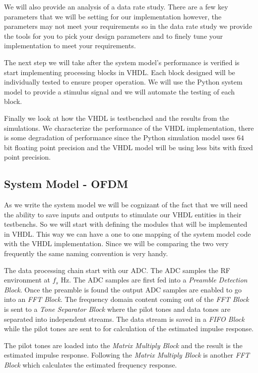 We will also provide an analysis of a data rate study. There are a few key parameters that we will be setting for our implementation however, the parameters may not meet your requirements so in the data rate study we provide the tools for you to pick your design parameters and to finely tune your implementation to meet your requirements.

The next step we will take after the system model's performance is verified is start implementing processing blocks in \ac{VHDL}. Each block designed will be individually tested to ensure proper operation. We will use the Python system model to provide a stimulus signal and we will automate the testing of each block.

Finally we look at how the \ac{VHDL} is testbenched and the results from the simulations. We characterize the performance of the \ac{VHDL} implementation, there is some degradation of performance since the Python simulation model uses $64$ bit floating point precision and the \ac{VHDL} model will be using less bits with fixed point precision.

\subsection{System Model - OFDM}

As we write the system model we will be cognizant of the fact that we will need the ability to save inputs and outputs to stimulate our \ac{VHDL} entities in their testbenchs. So we will start with defining the modules that will be implemented in \ac{VHDL}. This way we can have a one to one mapping of the system model code with the \ac{VHDL} implementation. Since we will be comparing the two very frequently the same naming convention is very handy.

The data processing chain start with our \ac{ADC}. The \ac{ADC} samples the \ac{RF} environment at $f_s$ \ac{Hz}. The \ac{ADC} samples are first fed into a \emph{Preamble Detection Block}. Once the preamble is found the output \ac{ADC} samples are enabled to go into an \emph{\ac{FFT} Block}. The frequency domain content coming out of the \emph{\ac{FFT} Block} is sent to a \emph{Tone Separator Block} where the pilot tones and data tones are separated into independent streams. The data stream is saved in a \emph{\ac{FIFO} Block} while the pilot tones are sent to for calculation of the estimated impulse response.

The pilot tones are loaded into the \emph{Matrix Multiply Block} and the result is the estimated impulse response. Following the \emph{Matrix Multiply Block} is another \emph{FFT Block} which calculates the estimated frequency response.

